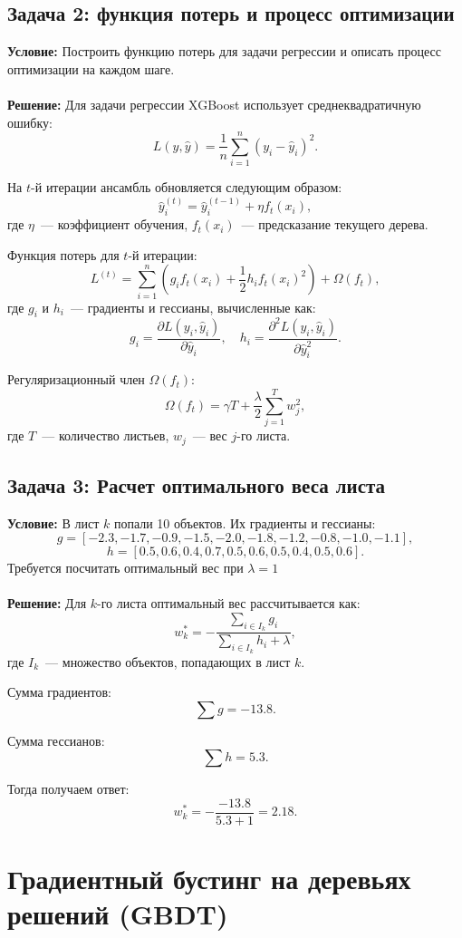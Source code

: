 \subsection*{Задача 2: функция потерь и процесс оптимизации}
\textbf{Условие:} Построить функцию потерь для задачи регрессии и описать процесс оптимизации на каждом шаге.
\\
\\
\textbf{Решение:} Для задачи регрессии XGBoost использует среднеквадратичную ошибку:
\[
L(y, \hat{y}) = \frac{1}{n} \sum_{i=1}^n (y_i - \hat{y}_i)^2.
\]

На $t$-й итерации ансамбль обновляется следующим образом:
\[
\hat{y}_i^{(t)} = \hat{y}_i^{(t-1)} + \eta f_t(x_i),
\]
где $\eta$~--- коэффициент обучения, $f_t(x_i)$~--- предсказание текущего дерева.

Функция потерь для $t$-й итерации:
\[
L^{(t)} = \sum_{i=1}^n \left( g_i f_t(x_i) + \frac{1}{2} h_i f_t(x_i)^2 \right) + \Omega(f_t),
\]
где $g_i$ и $h_i$~--- градиенты и гессианы, вычисленные как:
\[
g_i = \frac{\partial L(y_i, \hat{y}_i)}{\partial \hat{y}_i}, \quad h_i = \frac{\partial^2 L(y_i, \hat{y}_i)}{\partial \hat{y}_i^2}.
\]

Регуляризационный член $\Omega(f_t)$:
\[
\Omega(f_t) = \gamma T + \frac{\lambda}{2} \sum_{j=1}^T w_j^2,
\]
где $T$~--- количество листьев, $w_j$~--- вес $j$-го листа.

\subsection*{Задача 3: Расчет оптимального веса листа}
\textbf{Условие:} В лист $k$ попали 10 объектов. Их градиенты и гессианы:
\[
g = [-2.3, -1.7, -0.9, -1.5, -2.0, -1.8, -1.2, -0.8, -1.0, -1.1],
\]
\[
h = [0.5, 0.6, 0.4, 0.7, 0.5, 0.6, 0.5, 0.4, 0.5, 0.6].
\]
Требуется посчитать оптимальный вес при $\lambda = 1$
\\
\\
\textbf{Решение:} Для $k$-го листа оптимальный вес рассчитывается как:
\[
w_k^* = -\frac{\sum_{i \in I_k} g_i}{\sum_{i \in I_k} h_i + \lambda},
\]
где $I_k$~--- множество объектов, попадающих в лист $k$.

Сумма градиентов:
\[
\sum g = -13.8.
\]

Сумма гессианов:
\[
\sum h = 5.3.
\]

Тогда получаем ответ:
\[
w_k^* = -\frac{-13.8}{5.3 + 1} = 2.18.
\]

\section*{Градиентный бустинг на деревьях решений (GBDT)}

